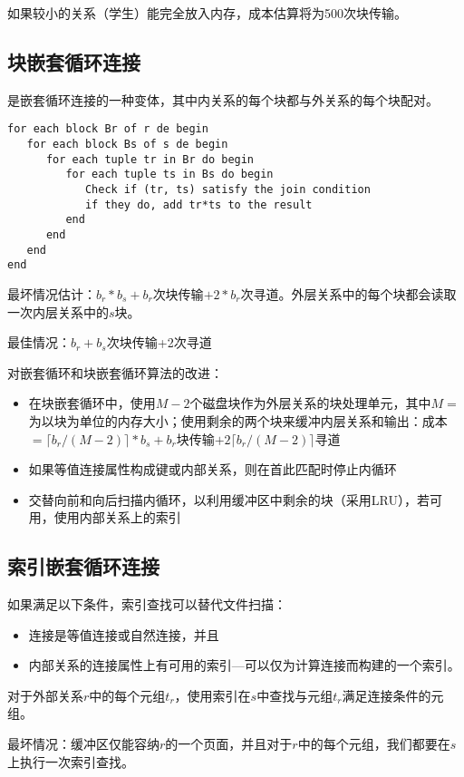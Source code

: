 如果较小的关系（学生）能完全放入内存，成本估算将为500次块传输。

\subsection{块嵌套循环连接}

是嵌套循环连接的一种变体，其中内关系的每个块都与外关系的每个块配对。
\begin{lstlisting}[style=sqlstyle]
for each block Br of r de begin
   for each block Bs of s de begin
      for each tuple tr in Br do begin
         for each tuple ts in Bs do begin
            Check if (tr, ts) satisfy the join condition
            if they do, add tr*ts to the result
         end
      end
   end
end    
\end{lstlisting}

最坏情况估计：$b_r*b_s+b_r$次块传输$+2*b_r$次寻道。外层关系中的每个块都会读取一次内层关系中的$s$块。

最佳情况：$b_r+b_s$次块传输+2次寻道

对嵌套循环和块嵌套循环算法的改进：
\begin{itemize}
    \item 在块嵌套循环中，使用$M-2$个磁盘块作为外层关系的块处理单元，其中$M=$为以块为单位的内存大小；使用剩余的两个块来缓冲内层关系和输出：成本$=\lceil  b_r/(M-2) \rceil*b_s+b_r$块传输$+2\lceil b_r/(M-2) \rceil$寻道
    \item 如果等值连接属性构成键或内部关系，则在首此匹配时停止内循环
    \item 交替向前和向后扫描内循环，以利用缓冲区中剩余的块（采用LRU），若可用，使用内部关系上的索引
\end{itemize}

\subsection{索引嵌套循环连接}
如果满足以下条件，索引查找可以替代文件扫描：
\begin{itemize}
    \item 连接是等值连接或自然连接，并且
    \item 内部关系的连接属性上有可用的索引---可以仅为计算连接而构建的一个索引。
\end{itemize}

对于外部关系$r$中的每个元组$t_r$，使用索引在$s$中查找与元组$t_r$满足连接条件的元组。

最坏情况：缓冲区仅能容纳$r$的一个页面，并且对于$r$中的每个元组，我们都要在$s$上执行一次索引查找。

